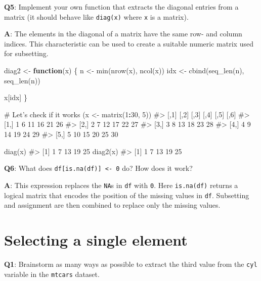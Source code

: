 \documentclass[
]{krantz}
\makeatletter
\newenvironment{Shaded}{\begin{snugshade}}{\end{snugshade}}
\newcommand{\CommentTok}[1]{\textcolor[rgb]{0.56,0.35,0.01}{\textit{#1}}}
\newcommand{\ControlFlowTok}[1]{\textcolor[rgb]{0.13,0.29,0.53}{\textbf{#1}}}
\newcommand{\DecValTok}[1]{\textcolor[rgb]{0.00,0.00,0.81}{#1}}
\newcommand{\KeywordTok}[1]{\textcolor[rgb]{0.13,0.29,0.53}{\textbf{#1}}}
\newcommand{\NormalTok}[1]{#1}
\newcommand{\OperatorTok}[1]{\textcolor[rgb]{0.81,0.36,0.00}{\textbf{#1}}}
\newcommand{\StringTok}[1]{\textcolor[rgb]{0.31,0.60,0.02}{#1}}
\newenvironment{kframe}{%
\medskip{}
\setlength{\fboxsep}{.8em}
 \def\at@end@of@kframe{}%
 \ifinner\ifhmode%
  \def\at@end@of@kframe{\end{minipage}}%
  \begin{minipage}{\columnwidth}%
 \fi\fi%
 \def\FrameCommand##1{\hskip\@totalleftmargin \hskip-\fboxsep
 \colorbox{shadecolor}{##1}\hskip-\fboxsep
     \hskip-\linewidth \hskip-\@totalleftmargin \hskip\columnwidth}%
 \MakeFramed {\advance\hsize-\width
   \@totalleftmargin\z@ \linewidth\hsize
   \@setminipage}}%
 {\par\unskip\endMakeFramed%
 \at@end@of@kframe}
\renewenvironment{Shaded}{\begin{kframe}}{\end{kframe}}
\renewcommand{\KeywordTok} [1]{\textcolor[rgb]{0.00,0.44,0.13}{{#1}}}
\renewcommand{\DecValTok}  [1]{\textcolor[rgb]{0.25,0.63,0.44}{{#1}}}
\renewcommand{\StringTok}  [1]{\textcolor[rgb]{0.25,0.44,0.63}{{#1}}}
\renewcommand{\CommentTok} [1]{\textcolor[rgb]{0.38,0.63,0.69}{{#1}}}
\renewcommand{\NormalTok}  [1]{{#1}}
\makeatother
\begin{document}
\textbf{{Q5}}: Implement your own function that extracts the diagonal entries from a matrix (it should behave like \texttt{diag(x)} where \texttt{x} is a matrix).

\textbf{{A}}: The elements in the diagonal of a matrix have the same row- and column indices. This characteristic can be used to create a suitable numeric matrix used for subsetting.

\begin{Shaded}
\begin{Highlighting}[]
\NormalTok{diag2 <-}\StringTok{ }\ControlFlowTok{function}\NormalTok{(x) \{}
\NormalTok{  n <-}\StringTok{ }\KeywordTok{min}\NormalTok{(}\KeywordTok{nrow}\NormalTok{(x), }\KeywordTok{ncol}\NormalTok{(x))}
\NormalTok{  idx <-}\StringTok{ }\KeywordTok{cbind}\NormalTok{(}\KeywordTok{seq_len}\NormalTok{(n), }\KeywordTok{seq_len}\NormalTok{(n))}

\NormalTok{  x[idx]}
\NormalTok{\}}

\CommentTok{# Let's check if it works}
\NormalTok{(x <-}\StringTok{ }\KeywordTok{matrix}\NormalTok{(}\DecValTok{1}\OperatorTok{:}\DecValTok{30}\NormalTok{, }\DecValTok{5}\NormalTok{))}
\CommentTok{#>      [,1] [,2] [,3] [,4] [,5] [,6]}
\CommentTok{#> [1,]    1    6   11   16   21   26}
\CommentTok{#> [2,]    2    7   12   17   22   27}
\CommentTok{#> [3,]    3    8   13   18   23   28}
\CommentTok{#> [4,]    4    9   14   19   24   29}
\CommentTok{#> [5,]    5   10   15   20   25   30}

\KeywordTok{diag}\NormalTok{(x)}
\CommentTok{#> [1]  1  7 13 19 25}
\KeywordTok{diag2}\NormalTok{(x)}
\CommentTok{#> [1]  1  7 13 19 25}
\end{Highlighting}
\end{Shaded}

\textbf{{Q6}}: What does \texttt{df{[}is.na(df){]}\ \textless{}-\ 0} do? How does it work?

\textbf{{A}}: This expression replaces the \texttt{NA}s in \texttt{df} with \texttt{0}. Here \texttt{is.na(df)} returns a logical matrix that encodes the position of the missing values in \texttt{df}. Subsetting and assignment are then combined to replace only the missing values.

\hypertarget{selecting-a-single-element}{%
\section{Selecting a single element}\label{selecting-a-single-element}}

\textbf{{Q1}}: Brainstorm as many ways as possible to extract the third value from the \texttt{cyl} variable in the \texttt{mtcars} dataset.
\end{document}
